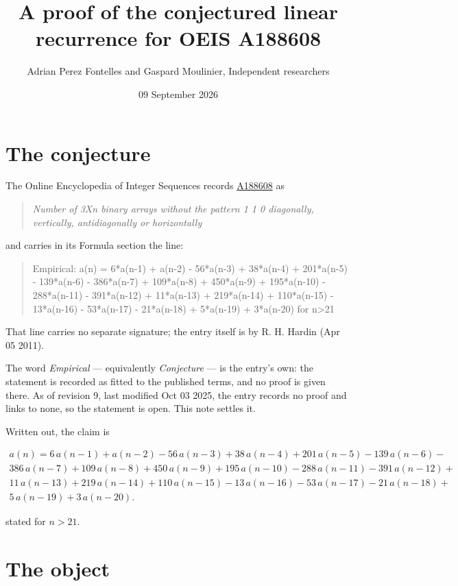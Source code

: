 \documentclass[11pt]{article}
\title{A proof of the conjectured linear recurrence for OEIS A188608}
\author{Adrian Perez Fontelles and Gaspard Moulinier, Independent researchers}
\date{09 September 2026}
\theoremstyle{definition}
\begin{document}
\maketitle
\section{The conjecture}

The Online Encyclopedia of Integer Sequences records \href{https://oeis.org/A188608}{A188608} as

\begin{quote}\itshape Number of 3Xn binary arrays without the pattern 1 1 0 diagonally, vertically, antidiagonally or horizontally\end{quote}

and carries in its Formula section the line:

\begin{quote}\ttfamily Empirical: a(n) = 6*a(n-1) + a(n-2) - 56*a(n-3) + 38*a(n-4) + 201*a(n-5) - 139*a(n-6) - 386*a(n-7) + 109*a(n-8) + 450*a(n-9) + 195*a(n-10) - 288*a(n-11) - 391*a(n-12) + 11*a(n-13) + 219*a(n-14) + 110*a(n-15) - 13*a(n-16) - 53*a(n-17) - 21*a(n-18) + 5*a(n-19) + 3*a(n-20) for n>21\end{quote}

That line carries no separate signature; the entry itself is by R. H. Hardin (Apr 05 2011).

The word {\itshape Empirical} --- equivalently {\itshape Conjecture} --- is the entry's own: the statement is recorded as fitted to the published terms, and no proof is given there. As of revision 9, last modified Oct 03 2025, the entry records no proof and links to none, so the statement is open. This note settles it.

Written out, the claim is

\begin{multline*} a(n) = 6\,a(n-1) + a(n-2) - 56\,a(n-3) + 38\,a(n-4) + 201\,a(n-5) - 139\,a(n-6) - \\ 386\,a(n-7) + 109\,a(n-8) + 450\,a(n-9) + 195\,a(n-10) - 288\,a(n-11) - 391\,a(n-12) + \\ 11\,a(n-13) + 219\,a(n-14) + 110\,a(n-15) - 13\,a(n-16) - 53\,a(n-17) - 21\,a(n-18) + \\ 5\,a(n-19) + 3\,a(n-20). \end{multline*}

stated for $n > 21$.

\section{The object}
\end{document}
